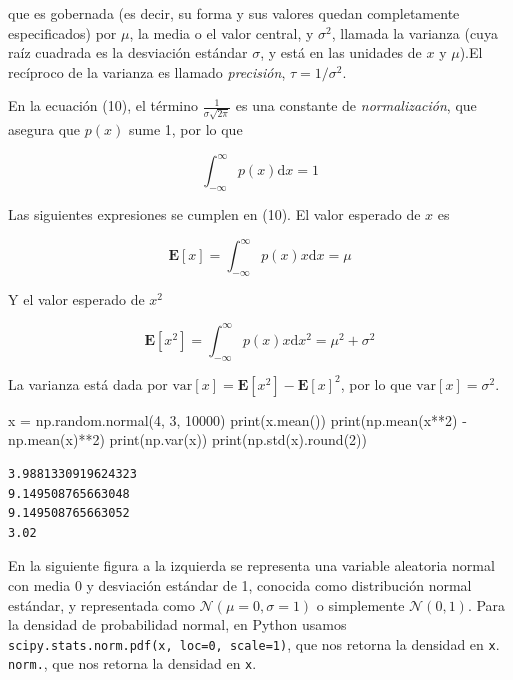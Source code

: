 \documentclass[
  letterpaper,
  DIV=11,
  numbers=noendperiod]{scrartcl}
\newenvironment{Shaded}{\begin{snugshade}}{\end{snugshade}}
\newcommand{\BuiltInTok}[1]{\textcolor[rgb]{0.00,0.23,0.31}{#1}}
\newcommand{\DecValTok}[1]{\textcolor[rgb]{0.68,0.00,0.00}{#1}}
\newcommand{\NormalTok}[1]{\textcolor[rgb]{0.00,0.23,0.31}{#1}}
\newcommand{\OperatorTok}[1]{\textcolor[rgb]{0.37,0.37,0.37}{#1}}
\begin{document}
que es gobernada (es decir, su forma y sus valores quedan completamente
especificados) por \(\mu\), la media o el valor central, y \(\sigma^2\),
llamada la varianza (cuya raíz cuadrada es la desviación estándar
\(\sigma\), y está en las unidades de \(x\) y \(\mu\)).El recíproco de
la varianza es llamado \emph{precisión}, \(\tau=1/\sigma^2\).

En la ecuación (10), el término \(\frac{1}{\sigma \sqrt{2\pi}}\) es una
constante de \emph{normalización}, que asegura que \(p(x)\) sume 1, por
lo que

\[
  \int_{-\infty}^\infty p(x)\text{d}x=1
\]

Las siguientes expresiones se cumplen en (10). El valor esperado de
\(x\) es

\[
  \mathbf{E}[x]=\int_{-\infty}^\infty p(x)x\text{d}x=\mu
\]

Y el valor esperado de \(x^2\)

\[
  \mathbf{E}[x^2] =  \int_{-\infty}^\infty p(x)x\text{d}x^2=\mu^2 + \sigma^2
\]

La varianza está dada por
\(\text{var}[x]=\mathbf{E}[x^2] - \mathbf{E}[x]^2\), por lo que
\(\text{var}[x]=\sigma^2\).

\begin{Shaded}
\begin{Highlighting}[]
\NormalTok{x }\OperatorTok{=}\NormalTok{ np.random.normal(}\DecValTok{4}\NormalTok{, }\DecValTok{3}\NormalTok{, }\DecValTok{10000}\NormalTok{)}
\BuiltInTok{print}\NormalTok{(x.mean())}
\BuiltInTok{print}\NormalTok{(np.mean(x}\OperatorTok{**}\DecValTok{2}\NormalTok{) }\OperatorTok{{-}}\NormalTok{ np.mean(x)}\OperatorTok{**}\DecValTok{2}\NormalTok{)}
\BuiltInTok{print}\NormalTok{(np.var(x))}
\BuiltInTok{print}\NormalTok{(np.std(x).}\BuiltInTok{round}\NormalTok{(}\DecValTok{2}\NormalTok{))}
\end{Highlighting}
\end{Shaded}

\begin{verbatim}
3.9881330919624323
9.149508765663048
9.149508765663052
3.02
\end{verbatim}

En la siguiente figura a la izquierda se representa una variable
aleatoria normal con media 0 y desviación estándar de 1, conocida como
distribución normal estándar, y representada como
\(\mathcal{N}(\mu=0, \sigma = 1)\) o simplemente \(\mathcal{N}(0, 1)\).
Para la densidad de probabilidad normal, en Python usamos
\texttt{scipy.stats.norm.pdf(x,\ loc=0,\ scale=1)}, que nos retorna la
densidad en \texttt{x}. \texttt{norm.}, que nos retorna la densidad en
\texttt{x}.
\end{document}
